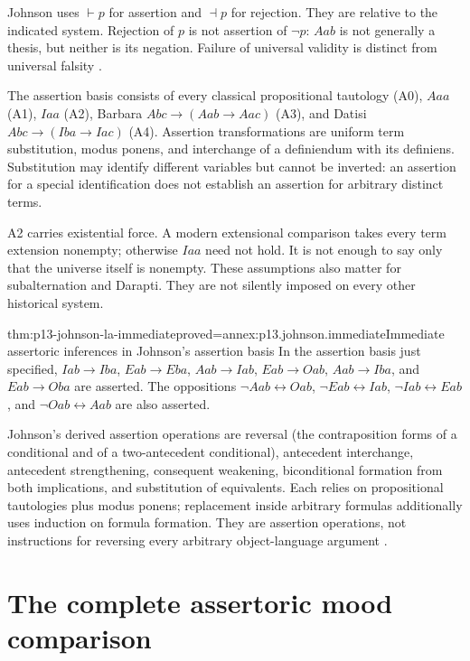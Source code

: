 Johnson uses \(\vdash p\) for assertion and \(\dashv p\) for rejection.
They are relative to the indicated system. Rejection of \(p\) is not
assertion of \(\neg p\): \(Aab\) is not generally a thesis, but neither is
its negation. Failure of universal validity is distinct from universal
falsity \parencite[pp.~248--249]{Johnson2004ModalSyllogisms}.

The assertion basis consists of every classical propositional tautology
(A0), \(Aaa\) (A1), \(Iaa\) (A2), Barbara
\(Abc\to(Aab\to Aac)\) (A3), and Datisi
\(Abc\to(Iba\to Iac)\) (A4). Assertion transformations are uniform
term substitution, modus ponens, and interchange of a definiendum with
its definiens. Substitution may identify different variables but cannot
be inverted: an assertion for a special identification does not establish
an assertion for arbitrary distinct terms.

A2 carries existential force. A modern extensional comparison takes every
term extension nonempty; otherwise \(Iaa\) need not hold. It is not enough
to say only that the universe itself is nonempty. These assumptions also
matter for subalternation and Darapti. They are not silently imposed on
every other historical system.

\begin{hbtheorem}{thm:p13-johnson-la-immediate}{proved=annex:p13.johnson.immediate}{Immediate assertoric inferences in Johnson's assertion basis}
In the assertion basis just specified, \(Iab\to Iba\), \(Eab\to Eba\),
\(Aab\to Iab\), \(Eab\to Oab\), \(Aab\to Iba\), and \(Eab\to Oba\)
are asserted. The oppositions
\(\neg Aab\leftrightarrow Oab\),
\(\neg Eab\leftrightarrow Iab\),
\(\neg Iab\leftrightarrow Eab\), and
\(\neg Oab\leftrightarrow Aab\) are also asserted.
\end{hbtheorem}

Johnson's derived assertion operations are reversal (the contraposition
forms of a conditional and of a two-antecedent conditional), antecedent
interchange, antecedent strengthening, consequent weakening, biconditional
formation from both implications, and substitution of equivalents.
Each relies on propositional tautologies plus modus ponens; replacement
inside arbitrary formulas additionally uses induction on formula
formation. They are assertion operations, not instructions for reversing
every arbitrary object-language argument
\parencite[pp.~250--252]{Johnson2004ModalSyllogisms}.

\section{The complete assertoric mood comparison}
\label{sec:p13-johnson-moods}

